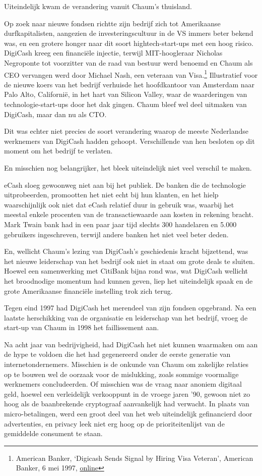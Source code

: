 \documentclass[smalldemyvopaper,11pt,twoside,onecolumn,openright,extrafontsizes,hidelinks]{memoir}
\begin{document}
Uiteindelijk kwam de verandering vanuit Chaum's thuisland.

Op zoek naar nieuwe fondsen richtte zijn bedrijf zich tot Amerikaanse
durfkapitalisten, aangezien de investeringscultuur in de VS immers beter
bekend was, en een grotere honger naar dit soort hightech-start-ups met
een hoog risico. DigiCash kreeg een financiële injectie, terwijl
MIT-hoogleraar Nicholas Negroponte tot voorzitter van de raad van
bestuur werd benoemd en Chaum als CEO vervangen werd door Michael Nash,
een veteraan van Visa.\footnote{American Banker, `Digicash Sends Signal
  by Hiring Visa Veteran', American Banker, 6 mei 1997,
  \href{https://www.americanbanker.com/news/digicash-sends-signal-by-hiring-visa-veteran}{online}}
Illustratief voor de nieuwe koers van het bedrijf verhuisde het
hoofdkantoor van Amsterdam naar Palo Alto, Californië, in het hart van
Silicon Valley, waar de waarderingen van technologie-start-ups door het
dak gingen. Chaum bleef wel deel uitmaken van DigiCash, maar dan nu als
CTO.

Dit was echter niet precies de soort verandering waarop de meeste
Nederlandse werknemers van DigiCash hadden gehoopt. Verschillende van
hen besloten op dit moment om het bedrijf te verlaten.

En misschien nog belangrijker, het bleek uiteindelijk niet veel verschil
te maken.

eCash sloeg gewoonweg niet aan bij het publiek. De banken die de
technologie uitprobeerden, promootten het niet echt bij hun klanten, en
het hielp waarschijnlijk ook niet dat eCash relatief duur in gebruik
was, waarbij het meestal enkele procenten van de transactiewaarde aan
kosten in rekening bracht. Mark Twain bank had in een paar jaar tijd
slechts 300 handelaren en 5.000 gebruikers ingeschreven, terwijl andere
banken het niet veel beter deden.

En, wellicht Chaum's lezing van DigiCash's geschiedenis kracht
bijzettend, was het nieuwe leiderschap van het bedrijf ook niet in staat
om grote deals te sluiten. Hoewel een samenwerking met CitiBank bijna
rond was, wat DigiCash wellicht het broodnodige momentum had kunnen
geven, liep het uiteindelijk spaak en de grote Amerikaanse financiële
instelling trok zich terug.

Tegen eind 1997 had DigiCash het merendeel van zijn fondsen opgebrand.
Na een laatste herschikking van de organisatie en leiderschap van het
bedrijf, vroeg de start-up van Chaum in 1998 het faillissement aan.

Na acht jaar van bedrijvigheid, had DigiCash het niet kunnen waarmaken
om aan de hype te voldoen die het had gegenereerd onder de eerste
generatie van internetondernemers. Misschien is de onkunde van Chaum om
zakelijke relaties op te bouwen wel de oorzaak voor de mislukking, zoals
sommige voormalige werknemers concludeerden. Of misschien was de vraag
naar anoniem digitaal geld, hoewel een verleidelijk verkooppunt in de
vroege jaren '90, gewoon niet zo hoog als de baanbrekende cryptograaf
aanvankelijk had verwacht. In plaats van micro-betalingen, werd een
groot deel van het web uiteindelijk gefinancierd door advertenties, en
privacy leek niet erg hoog op de prioriteitenlijst van de gemiddelde
consument te staan.
\end{document}
